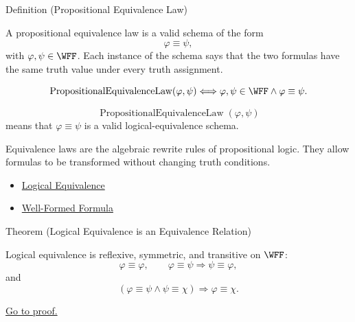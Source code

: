 \begin{definitionbox}{Definition (Propositional Equivalence Law)}
\begin{definition}
\label{def:propositional-equivalence-law}
A propositional equivalence law is a valid schema of the form
\[
\varphi\equiv\psi,
\]
with \(\varphi,\psi\in\WFF\). Each instance of the schema says that the two formulas have the same truth value under every truth assignment.
\end{definition}
\end{definitionbox}

\begin{remark*}
\[
\operatorname{PropositionalEquivalenceLaw}(\varphi,\psi)
\Longleftrightarrow
\varphi,\psi\in\WFF
\land
\varphi\equiv\psi.
\]
\end{remark*}

\begin{remark*}
\[
\operatorname{PropositionalEquivalenceLaw}(\varphi,\psi)
\]
means that \(\varphi\equiv\psi\) is a valid logical-equivalence schema.
\end{remark*}

\begin{remark*}[Interpretation]
Equivalence laws are the algebraic rewrite rules of propositional logic. They allow formulas to be transformed without changing truth conditions.
\end{remark*}

\begin{dependencies}
\begin{itemize}
  \item \hyperref[def:logical-equivalence-propositional-logic]{Logical Equivalence}
  \item \hyperref[def:well-formed-formula]{Well-Formed Formula}
\end{itemize}
\end{dependencies}
\begin{theorembox}{Theorem (Logical Equivalence is an Equivalence Relation)}
\begin{theorem}
\label{thm:logical-equivalence-equivalence-relation}
Logical equivalence is reflexive, symmetric, and transitive on \(\WFF\):
\[
\varphi\equiv\varphi,
\qquad
\varphi\equiv\psi\Longrightarrow\psi\equiv\varphi,
\]
and
\[
(\varphi\equiv\psi\land\psi\equiv\chi)
\Longrightarrow
\varphi\equiv\chi.
\]

\noindent\hyperref[prf:logical-equivalence-equivalence-relation]{Go to proof.}
\end{theorem}
\end{theorembox}

